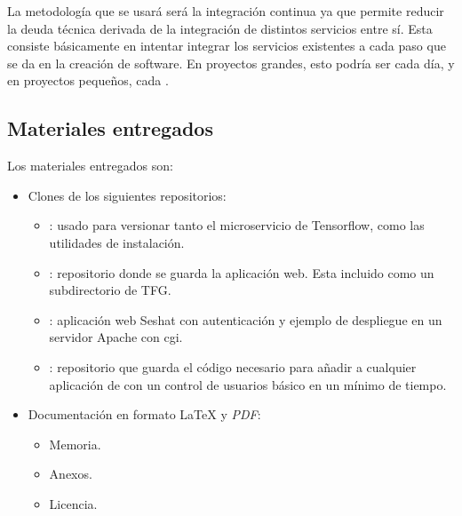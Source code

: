 La metodología que se usará será la integración continua ya que permite reducir la deuda técnica derivada de la integración de distintos servicios entre sí. Esta consiste básicamente en intentar integrar los servicios existentes a cada paso que se da en la creación de software. En proyectos grandes, esto podría ser cada día, y en proyectos pequeños, cada .


\subsection{Materiales entregados}

Los materiales entregados son:

\begin{itemize}
	\item Clones de los siguientes repositorios:
	\begin{itemize}
		\item {}: usado para versionar tanto el microservicio de Tensorflow, como las utilidades de instalación.
		\item {}: repositorio donde se guarda la aplicación web. Esta incluido como un subdirectorio de TFG.
		\item {}: aplicación web Seshat con autenticación y ejemplo de despliegue en un servidor Apache con cgi.
		\item {}: repositorio que guarda el código necesario para añadir a cualquier aplicación de  con un control de usuarios básico en un mínimo de tiempo.
	\end{itemize}
	\item Documentación en formato \LaTeX{} y \textit{PDF}:
	\begin{itemize}
		\item Memoria.
		\item Anexos.
		\item Licencia.
	\end{itemize}
\end{itemize}



